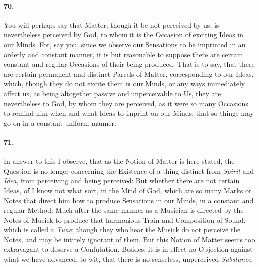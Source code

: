 \documentclass[]{article}
\newenvironment{sectionbody}{}{}
\begin{document}
\begin{sectionbody}
\paragraph{70.} You will perhaps say that Matter, though it be not perceived by
us, is nevertheless perceived by {\sc God}, to whom it is the Occasion
of exciting Ideas in our Minds.  For, say you, since we observe
our Sensations to be imprinted in an orderly and constant manner,
it is but reasonable to suppose there are certain constant and
regular Occasions of their being produced.  That is to say, that
there are certain permanent and distinct Parcels of Matter,
corresponding to our Ideas, which, though they do not excite them
in our Minds, or any ways immediately affect us, as being
altogether passive and unperceivable to Us, they are nevertheless
to {\sc God}, by whom they are perceived, as it were so many Occasions
to remind him when and what Ideas to imprint on our Minds: that
so things may go on in a constant uniform manner.



\paragraph{71.} In answer to this I observe, that as the Notion of Matter is here
stated, the Question is no longer concerning the Existence of a
thing distinct from \emph{Spirit} and \emph{Idea}, from
perceiving and being perceived: But whether there are not certain
Ideas, of I know not what sort, in the Mind of {\sc God}, which are so
many Marks or Notes that direct him how to produce Sensations in
our Minds, in a constant and regular Method: Much after the same
manner as a Musician is directed by the Notes of Musick to
produce that harmonious Train and Composition of Sound, which is
called a \emph{Tune}; though they who hear the Musick do not
perceive the Notes, and may be intirely ignorant of them.  But
this Notion of Matter seems too extravagant to deserve a
Confutation.  Besides, it is in effect no Objection against what
we have advanced, to wit, that there is no senseless, unperceived
\emph{Substance}.




\end{sectionbody}
\end{document}
